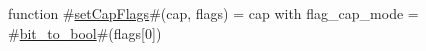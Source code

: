 function #\hyperref[sailRISCVzsetCapFlags]{setCapFlags}#(cap, flags) = {cap with flag_cap_mode = #\hyperref[sailRISCVzbitzytozybool]{bit\_to\_bool}#(flags[0])}

